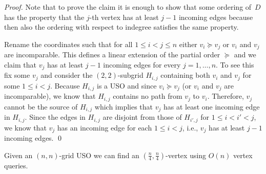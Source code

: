 \documentclass[runningheads,a4paper]{llncs}
\newcommand{\JN}[1]{\marginpar{\parbox{3.6cm}{{\small {\bf JN:} #1}}}} %
\begin{document}
\begin{proof}
Note that to prove the claim it is enough to show that some ordering of~$D$ has the property that the $j$-th vertex has at least $j-1$ incoming edges because then also the ordering with respect to indegree satisfies the same property. 

Rename the coordinates such that for all $1 \leq i < j\leq n$ either $v_i \succeq v_j$ or $v_i$ and $v_j$ are incomparable. 
This defines a linear extension of the partial order $\succeq$ and we claim that $v_j$ has at least $j-1$ incoming edges for every $j = 1, \ldots, n$. 
To see this fix some $v_j$ and consider the $(2,2)$-subgrid $H_{i,j}$ containing both $v_i$ and $v_j$ for some $1\leq i < j$. 
Because $H_{i,j}$ is a USO and since $v_i \succeq v_j$ (or $v_i$ and $v_j$ are incomparable), we know that $H_{i,j}$ contains no path from $v_j$ to $v_i$. 
Therefore, $v_j$ cannot be the source of $H_{i,j}$  which implies that $v_j$ has at least one incoming edge in $H_{i,j}$. 
Since the edges in $H_{i,j}$ are disjoint from those of $H_{i',j}$ for $1\leq i < i' < j$, 
we know that $v_j$ has an incoming edge for each $1\leq i< j$, i.e., $v_j$ has at least $j-1$ incoming edges. 
 \qed
\end{proof}

\begin{lemma}
\label{lem:seed_lemma_for_square_matrices}
 Given an $(n, n)$-grid USO we can find an $(\frac{n}{4}, \frac{n}{4})$-vertex using $O(n)$ vertex queries.
\end{lemma}
\end{document}
